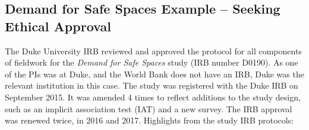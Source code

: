 \documentclass[
]{book}
\begin{document}
\begin{ex}
\hypertarget{demand-for-safe-spaces-example-seeking-ethical-approval}{%
\subsection*{Demand for Safe Spaces Example -- Seeking Ethical Approval}\label{demand-for-safe-spaces-example-seeking-ethical-approval}}

The Duke University IRB reviewed and approved the protocol for all components of fieldwork for the \emph{Demand for Safe Spaces} study (IRB number D0190). As one of the PIs was at Duke, and the World Bank does not have an IRB, Duke was the relevant institution in this case. The study was registered with the Duke IRB on September 2015. It was amended 4 times to reflect additions to the study design, such as an implicit association test (IAT) and a new survey. The IRB approval was renewed twice, in 2016 and 2017.
Highlights from the study IRB protocols:


\end{ex}
\end{document}
